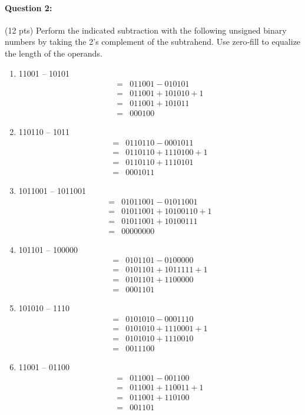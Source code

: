 \documentclass[12pt,letterpaper,titlepage]{report}
\begin{document}
\begin{raggedright}
\paragraph{Question 2:}
(12 pts) Perform the indicated subtraction with the following unsigned binary numbers by taking the 2’s complement of the subtrahend. Use zero‐fill to equalize the length of the operands. 
\begin{multicols}{2}
\begin{enumerate} [label=\alph*)]
\item 11001 – 10101
\begin{align*}
  =& 011001 - 010101
\\=& 011001 + 101010 + 1
\\=& 011001 + 101011
\\=& 000100
\end{align*}
\item 110110 – 1011
\begin{align*}
  =& 0110110 - 0001011
\\=& 0110110 + 1110100 + 1
\\=& 0110110 + 1110101
\\=& 0001011
\end{align*}
\item 1011001 – 1011001
\begin{align*}
  =& 01011001 - 01011001
\\=& 01011001 + 10100110 + 1
\\=& 01011001 + 10100111
\\=& 00000000
\end{align*}
\item 101101 – 100000
\begin{align*}
  =& 0101101 - 0100000
\\=& 0101101 + 1011111 + 1
\\=& 0101101 + 1100000
\\=& 0001101
\end{align*}
\item 101010 – 1110
\begin{align*}
  =& 0101010 - 0001110
\\=& 0101010 + 1110001 + 1
\\=& 0101010 + 1110010
\\=& 0011100
\end{align*}
\item 11001 – 01100
\begin{align*}
  =& 011001 - 001100
\\=& 011001 + 110011 + 1
\\=& 011001 + 110100
\\=& 001101
\end{align*}
\end{enumerate}
\end{multicols}
\clearpage

\end{raggedright}
\end{document}

